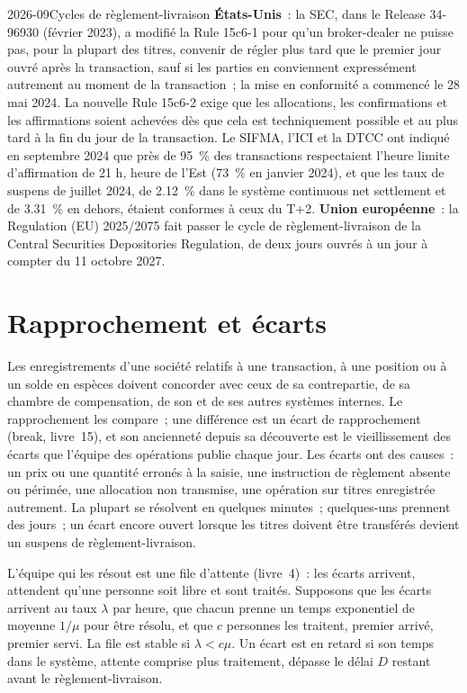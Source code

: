 \begin{dated}{2026-09}{Cycles de règlement-livraison}\label{dat:fm:operations:cycle}
\textbf{États-Unis}~: la SEC, dans le Release 34-96930 (février 2023), a modifié la Rule 15c6-1 pour qu'un broker-dealer ne puisse pas, pour la plupart des titres, convenir
de régler plus tard que le premier jour ouvré après la transaction, sauf si les parties en conviennent expressément autrement au moment de la transaction~; la mise en conformité a commencé
le 28 mai 2024. La nouvelle Rule 15c6-2 exige que les allocations, les confirmations et les affirmations soient achevées dès que cela est techniquement possible et au
plus tard à la fin du jour de la transaction. Le SIFMA, l'ICI et la DTCC ont indiqué en septembre 2024 que près de 95~\% des transactions respectaient l'heure limite d'affirmation
de 21 h, heure de l'Est (73~\% en janvier 2024), et que les taux de suspens de juillet 2024, de 2.12~\% dans le système continuous net settlement et de 3.31~\% en dehors, étaient conformes à ceux du T+2.
\textbf{Union européenne}~: la Regulation (EU) 2025/2075 fait passer le cycle de règlement-livraison de la Central Securities
Depositories Regulation, de deux jours ouvrés à un jour à compter du 11 octobre 2027.
\end{dated}

\section{Rapprochement et écarts}

Les enregistrements d'une société relatifs à une transaction, à une position ou à un solde en espèces doivent concorder avec ceux de sa contrepartie, de sa chambre de compensation, de son  et de ses
autres systèmes internes. Le rapprochement les compare~; une différence est un écart de rapprochement (break, livre~15), et son ancienneté depuis sa découverte est le vieillissement des écarts
que l'équipe des opérations publie chaque jour. Les écarts ont des causes~: un prix ou une quantité erronés à la saisie, une instruction de règlement absente ou périmée, une
allocation non transmise, une opération sur titres enregistrée autrement. La plupart se résolvent en quelques minutes~; quelques-uns prennent des jours~; un écart encore ouvert lorsque les titres
doivent être transférés devient un suspens de règlement-livraison.

L'équipe qui les résout est une file d'attente (livre~4)~: les écarts arrivent, attendent qu'une personne soit libre et sont traités. Supposons que les écarts arrivent au taux $\lambda$ par heure,
que chacun prenne un temps exponentiel de moyenne $1/\mu$ pour être résolu, et que $c$ personnes les traitent, premier arrivé, premier servi. La file est stable si
$\lambda<c\mu$. Un écart est en retard si son temps dans le système, attente comprise plus traitement, dépasse le délai $D$ restant avant le règlement-livraison.

